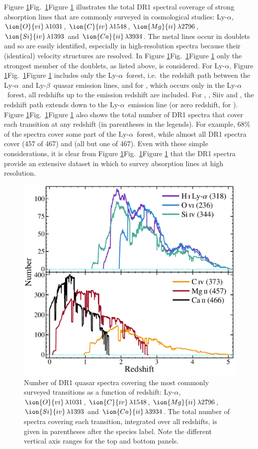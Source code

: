\documentclass[fleqn,usenatbib,usedcolumn]{mnras}
\newcommand{\Fref}[1]{\ifhmode \ifnum\spacefactor=1001 Figure \ref{#1}\else Fig.\ \ref{#1}\fi \else Figure \ref{#1}\fi}
\newcommand{\lya}{\ensuremath{\textrm{Ly-}\alpha}}
\newcommand{\lyb}{\ensuremath{\textrm{Ly-}\beta}}
\newcommand{\tran}[3]{\ensuremath{\ion{#1}{#2}\,\lambda\textrm{#3}}}
\begin{document}
\Fref{f:trancov} illustrates the total DR1 spectral coverage of strong absorption lines that are commonly surveyed in cosmological studies:  \lya, \tran{O}{vi}{1031}, \tran{C}{iv}{1548}, \tran{Mg}{ii}{2796}, \tran{Si}{iv}{1393} and \tran{Ca}{ii}{3934}. The metal lines occur in doublets and so are easily identified, especially in high-resolution spectra because their (identical) velocity structures are resolved. In \Fref{f:trancov} only the strongest member of the doublets, as listed above, is considered. For  \lya, \Fref{f:trancov} includes only the \lya\ forest, i.e.\ the redshift path between the \lya\ and \lyb\ quasar emission lines, and for , which occurs only in the \lya\ forest, all redshifts up to the emission redshift are included. For , , {Si}{iv} and , the redshift path extends down to the \lya\ emission line (or zero redshift, for ). \Fref{f:trancov} also shows the total number of DR1 spectra that cover each transition at any redshift (in parentheses in the legends). For example, 68\% of the spectra cover some part of the \lya\ forest, while almost all DR1 spectra cover  (457 of 467) and  (all but one of 467). Even with these simple considerations, it is clear from \Fref{f:trancov} that the DR1 spectra provide an extensive dataset in which to survey absorption lines at high resolution.

\begin{figure}
\begin{center}
\includegraphics[width=0.95\columnwidth]{DR1_trancoverage.pdf}
\vspace{-1em}
\caption{Number of DR1 quasar spectra covering the most commonly surveyed transitions as a function of redshift:  \lya, \tran{O}{vi}{1031}, \tran{C}{iv}{1548}, \tran{Mg}{ii}{2796}, \tran{Si}{iv}{1393} and \tran{Ca}{ii}{3934}. The total number of spectra covering each transition, integrated over all redshifts, is given in parentheses after the species label. Note the different vertical axis ranges for the top and bottom panels.}
\label{f:trancov}
\end{center}
\end{figure}
\end{document}
